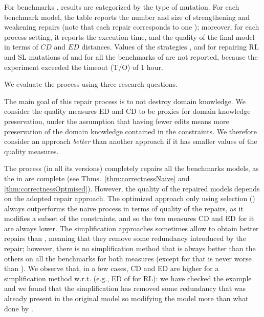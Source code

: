 \begin{tikzborder}{\cite{Gargantini16:validation}}
\begin{tikzborder}{\cite{gargantini_combinatorial_2017}}
\begin{tikzborder}{\cite{gargantini_combinatorial_2017}}
\begin{tikzborder}{\cite{garn2019}}
\begin{tikzborder}{\cite{arcaini2019achieving}}
\begin{tikzborder}{\cite{arcaini2019varivolution}}
		\bb 	For benchmarks \benchMut, results are categorized by the type of mutation. For each benchmark model, the table reports the number and size of strengthening and weakening repairs (note that each repair corresponds to one \fcc); moreover, for each process setting, it reports the execution time, and the quality of the final model \mRep in terms of $\mathit{CD}$ and $\mathit{ED}$ distances. Values of the strategies \atgt, \jbool and \qm for repairing \textsf{RL} and \textsf{SL} mutations of \tightVnc and for all the benchmarks of \benchReal are not reported, because the experiment exceeded the timeout (T/O) of 1 hour.
		
		We evaluate the process using three research questions.
		
		
		The main goal of this repair process is to not destroy domain knowledge. We consider the quality measures \textsf{ED} and \textsf{CD} to be proxies for domain knowledge preservation, under the assumption that having fewer edits means more preservation of the domain knowledge contained in the constraints. We therefore consider an approach {\it better} than another approach if it has smaller values of the quality measures.
		
		The process (in all its versions) completely repairs all the benchmarks models, as the \fccs in \fccSet are complete (see Thms.~\ref{thm:correctnessNaive} and \ref{thm:correctnessOptmised}). However, the quality of the repaired models depends on the adopted repair approach. The optimized approach only using selection (\onlySelection) always outperforms the na{\"i}ve process in terms of quality of the repairs, as it modifies a subset of the constraints, and so the two measures CD and ED for it are always lower. The simplification approaches sometimes allow to obtain better repairs than \onlySelection, meaning that they remove some redundancy introduced by the repair; however, there is no simplification method that is always better than the others on all the benchmarks for both measures (except for \atgt that is never worse than \espresso). 
		We observe that, in a few cases, CD and ED are higher for a simplification method w.r.t. \onlySelection (e.g., ED of \espresso for \register RL): we have checked the example and we found that the simplification has removed some redundancy that was already present in the original model \m so modifying the model more than what done by \onlySelection.
		

\end{tikzborder}
\end{tikzborder}
\end{tikzborder}
\end{tikzborder}
\end{tikzborder}
\end{tikzborder}
